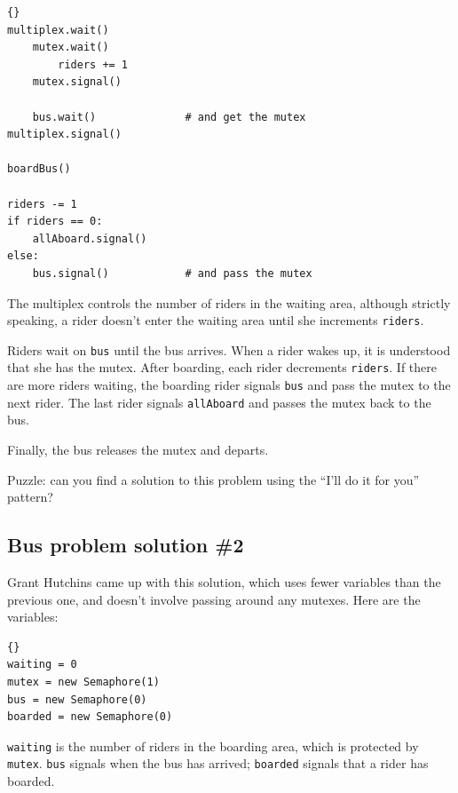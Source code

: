 \documentclass{book}
\newcommand{\clearemptydoublepage}{\newpage\cleardoublepage}
\begin{document}
\begin{latin}
\begin{lstlisting}[title={Bus problem solution (riders)}]{}
multiplex.wait()
    mutex.wait()
        riders += 1
    mutex.signal()

    bus.wait()              # and get the mutex
multiplex.signal()

boardBus()

riders -= 1
if riders == 0:
    allAboard.signal() 
else:
    bus.signal()            # and pass the mutex
\end{lstlisting}
\end{latin}

The multiplex controls the number of riders in the waiting area,
although strictly speaking, a rider doesn't enter the waiting
area until she increments {\tt riders}.

Riders wait on {\tt bus} until the bus arrives.  When a rider
wakes up, it is understood that she has the mutex.
After boarding, each rider decrements {\tt riders}.  If there
are more riders waiting, the boarding rider signals {\tt bus}
and pass the mutex to the next rider.  The last rider signals
{\tt allAboard} and passes the mutex back to the bus.

Finally, the bus releases the mutex and departs.

Puzzle: can you find a solution to this problem using the
``I'll do it for you'' pattern?


\clearemptydoublepage
\subsection {Bus problem solution \#2}

Grant Hutchins came up with this solution, which uses fewer
variables than the previous one, and doesn't involve passing
around any mutexes.  Here are the variables:

\begin{latin}
\begin{lstlisting}[title={Bus problem solution \#2 (initialization)}]{}
waiting = 0
mutex = new Semaphore(1)
bus = new Semaphore(0)
boarded = new Semaphore(0)
\end{lstlisting}
\end{latin}

{\tt waiting} is the number of riders in the boarding area,
which is protected by {\tt mutex}.  {\tt bus} signals when the
bus has arrived; {\tt boarded} signals that a rider has boarded.
\end{document}
